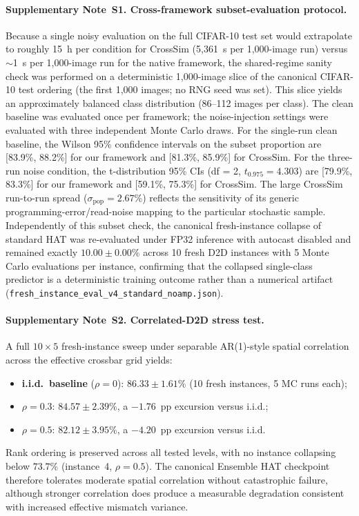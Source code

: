 \paragraph{Supplementary Note~S1. Cross-framework subset-evaluation protocol.}
Because a single noisy evaluation on the full CIFAR-10 test set would extrapolate to roughly 15~h per condition for CrossSim (5,361~s per 1,000-image run) versus $\sim$1~s per 1,000-image run for the native framework, the shared-regime sanity check was performed on a deterministic 1,000-image slice of the canonical CIFAR-10 test ordering (the first 1,000 images; no RNG seed was set). This slice yields an approximately balanced class distribution (86--112 images per class). The clean baseline was evaluated once per framework; the noise-injection settings were evaluated with three independent Monte Carlo draws. For the single-run clean baseline, the Wilson 95\% confidence intervals on the subset proportion are [83.9\%, 88.2\%] for our framework and [81.3\%, 85.9\%] for CrossSim. For the three-run noise condition, the t-distribution 95\% CIs (df = 2, $t_{0.975} = 4.303$) are [79.9\%, 83.3\%] for our framework and [59.1\%, 75.3\%] for CrossSim. The large CrossSim run-to-run spread ($\sigma_{\text{pop}} = 2.67$\%) reflects the sensitivity of its generic programming-error/read-noise mapping to the particular stochastic sample. Independently of this subset check, the canonical fresh-instance collapse of standard HAT was re-evaluated under FP32 inference with autocast disabled and remained exactly $10.00\pm0.00$\% across 10 fresh D2D instances with 5 Monte Carlo evaluations per instance, confirming that the collapsed single-class predictor is a deterministic training outcome rather than a numerical artifact (\texttt{fresh\_instance\_eval\_v4\_standard\_noamp.json}).

\paragraph{Supplementary Note~S2. Correlated-D2D stress test.}
A full $10\times5$ fresh-instance sweep under separable AR(1)-style spatial correlation across the effective crossbar grid yields:
\begin{itemize}
    \item \textbf{i.i.d.\ baseline} ($\rho=0$): $86.33 \pm 1.61$\% (10 fresh instances, 5 MC runs each);
    \item \textbf{$\rho=0.3$}: $84.57 \pm 2.39$\%, a $-1.76$~pp excursion versus i.i.d.;
    \item \textbf{$\rho=0.5$}: $82.12 \pm 3.95$\%, a $-4.20$~pp excursion versus i.i.d.
\end{itemize}
Rank ordering is preserved across all tested levels, with no instance collapsing below $73.7$\% (instance~4, $\rho=0.5$). The canonical Ensemble HAT checkpoint therefore tolerates moderate spatial correlation without catastrophic failure, although stronger correlation does produce a measurable degradation consistent with increased effective mismatch variance.

